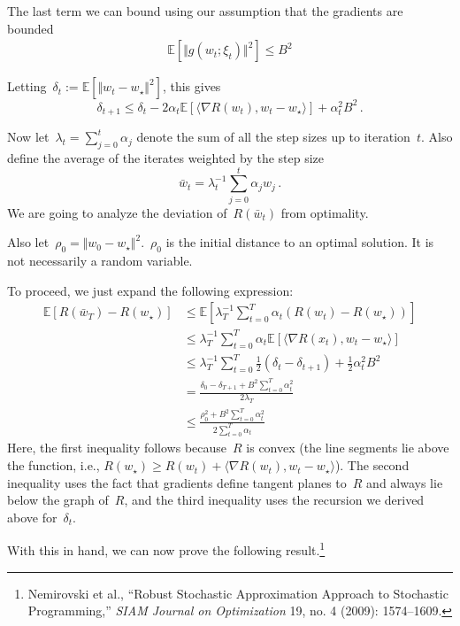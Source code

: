 \documentclass{tufte-book}
\begin{document}
The last term we can bound using our assumption that the gradients are
bounded \[
\begin{aligned}
\mathbb{E}[ \Vert g(w_t; \xi_t)\Vert^2]  \leq B^2
\end{aligned}
\]

Letting~\(\delta_t := \mathbb{E}[\Vert w_{t}-w_\star\Vert^2]\), this
gives \[
 \delta_{t+1} \leq \delta_t - 2 \alpha_t \mathbb{E}\left[ \langle \nabla R(w_t) , w_t - w_\star \rangle\right] + \alpha_t^2 B^2\,.
\]

Now let~\(\lambda_t = \sum_{j=0}^t \alpha_j\) denote the sum of all the
step sizes up to iteration~\(t\). Also define the average of the
iterates weighted by the step size \[
    \bar{w}_t = \lambda_t^{-1} \sum_{j=0}^t \alpha_j w_j\,.
\] We are going to analyze the deviation of~\(R(\bar{w}_t)\) from
optimality.

Also let~\(\rho_0 = \Vert w_0-w_\star\Vert^2\).~\(\rho_0\) is the
initial distance to an optimal solution. It is not necessarily a random
variable.

To proceed, we just expand the following expression: \[
\begin{aligned}
\mathbb{E}\left[  R\left (\bar{w}_T \right)  - R(w_\star)  \right]  & \leq
    \mathbb{E}\left[ \lambda_T^{-1} \sum_{t=0}^T \alpha_t( R(w_t)  - R(w_\star) ) \right] \\
    &\leq   \lambda_T^{-1} \sum_{t=0}^T \alpha_t \mathbb{E}[ \langle \nabla R(x_t), w_t-w_\star \rangle ]\\
    &\leq   \lambda_T^{-1} \sum_{t=0}^T \tfrac{1}{2}(\delta_{t}-\delta_{t+1})+ \tfrac{1}{2} \alpha_t^2 B^2\\
    & = \frac{\delta_0 - \delta_{T+1} +  B^2 \sum_{t=0}^T \alpha_t^2}{2 \lambda_T}\\
    & \leq \frac{\rho_0^2  + B^2 \sum_{t=0}^T \alpha_t^2}{2 \sum_{t=0}^T \alpha_t}
\end{aligned}
\] Here, the first inequality follows because~\(R\) is convex (the line
segments lie above the function, i.e.,
\(R(w_\star) \geq R(w_t) + \langle\nabla R(w_t), w_t-w_\star\rangle\)).
The second inequality uses the fact that gradients define tangent planes
to~\(R\) and always lie below the graph of~\(R\), and the third
inequality uses the recursion we derived above for~\(\delta_t\).

With this in hand, we can now prove the following result.\footnote{Nemirovski
  et al., {``Robust Stochastic Approximation Approach to Stochastic
  Programming,''} \emph{SIAM Journal on Optimization} 19, no. 4 (2009):
  1574--1609.}
\end{document}
